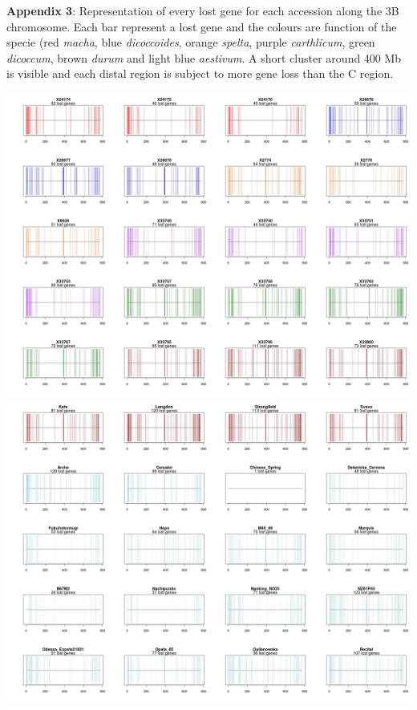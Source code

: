 \documentclass[a4paper, 12pt]{article}
\begin{document}
\newpage
\pagestyle{empty}
    \textbf{Appendix 3}: Representation of every lost gene for each accession along the 3B chromosome. Each bar represent a lost gene and the colours are function of the specie (red \textit{macha}, blue \textit{dicoccoides}, orange \textit{spelta}, purple \textit{carthlicum}, green \textit{dicoccum}, brown \textit{durum} and light blue \textit{aestivum}. A short cluster around 400 Mb is visible and each distal region is subject to more gene loss than the C region.
    
\vspace{1cm}

\centering \includegraphics[scale=0.28]{appendix/Appendix_4_1.jpg}
\newpage
\pagestyle{empty}
\centering \includegraphics[scale=0.28]{appendix/Appendix_4_2.jpg}
\end{document}
